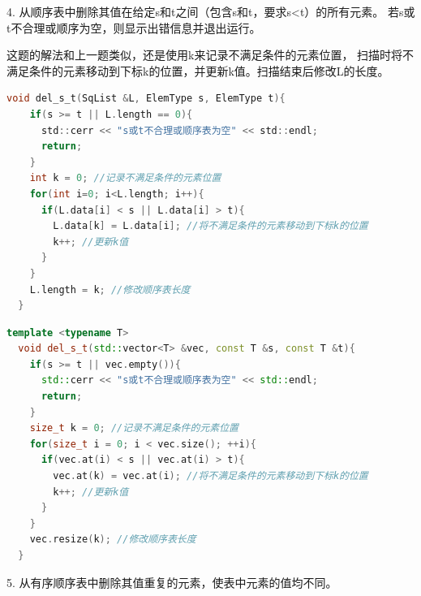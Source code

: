 \documentclass[b5paper,11pt]{article}
\begin{document}
\psplit

\begin{question}
4. 从顺序表中删除其值在给定s和t之间（包含s和t，要求s<t）的所有元素。
若s或t不合理或顺序为空，则显示出错信息并退出运行。
\end{question}

\begin{solution}
这题的解法和上一题类似，还是使用k来记录不满足条件的元素位置，
扫描时将不满足条件的元素移动到下标k的位置，并更新k值。扫描结束后修改L的长度。
\begin{lstlisting}[language=C]
  void del_s_t(SqList &L, ElemType s, ElemType t){
    if(s >= t || L.length == 0){
      std::cerr << "s或t不合理或顺序表为空" << std::endl;
      return;
    }
    int k = 0; //记录不满足条件的元素位置
    for(int i=0; i<L.length; i++){
      if(L.data[i] < s || L.data[i] > t){
        L.data[k] = L.data[i]; //将不满足条件的元素移动到下标k的位置
        k++; //更新k值
      }
    }
    L.length = k; //修改顺序表长度
  }
\end{lstlisting}

\begin{lstlisting}[language=C++]
  template <typename T>
  void del_s_t(std::vector<T> &vec, const T &s, const T &t){
    if(s >= t || vec.empty()){
      std::cerr << "s或t不合理或顺序表为空" << std::endl;
      return;
    }
    size_t k = 0; //记录不满足条件的元素位置
    for(size_t i = 0; i < vec.size(); ++i){
      if(vec.at(i) < s || vec.at(i) > t){
        vec.at(k) = vec.at(i); //将不满足条件的元素移动到下标k的位置
        k++; //更新k值
      }
    }
    vec.resize(k); //修改顺序表长度
  }
\end{lstlisting}
\end{solution}

\psplit

\begin{question}
5. 从有序顺序表中删除其值重复的元素，使表中元素的值均不同。
\end{question}
\end{document}
